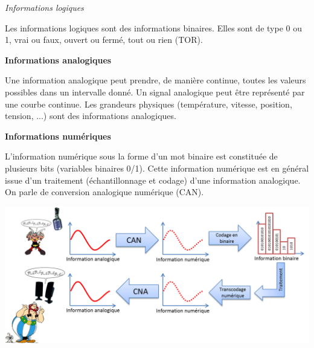\documentclass[10pt,fleqn]{article} %
\begin{document}
\begin{defi}
 \textit{\textsf{Informations logiques}}

Les informations logiques sont des informations binaires. Elles sont de type 0
ou 1, vrai ou faux, ouvert ou fermé, tout ou rien (TOR).

\end{defi}

\begin{defi}
\textbf{Informations analogiques}

Une information analogique peut prendre, de manière continue, toutes les valeurs
possibles dans un intervalle donné. Un signal analogique peut être représenté
par une courbe continue. Les grandeurs physiques (température, vitesse,
position, tension, ...) sont des informations analogiques.

\end{defi}


\begin{defi}
 \textbf{Informations numériques}

L'information numérique sous la forme d'un mot binaire est constituée de
plusieurs bits (variables binaires 0/1). Cette information numérique est en
général issue d'un traitement (échantillonnage et codage) d'une information
analogique. On parle de conversion analogique numérique (CAN).

\end{defi}


\begin{exemple}
  \begin{center}
    \includegraphics[width=.9\textwidth]{images/info}
  \end{center}
\end{exemple}
\end{document}

